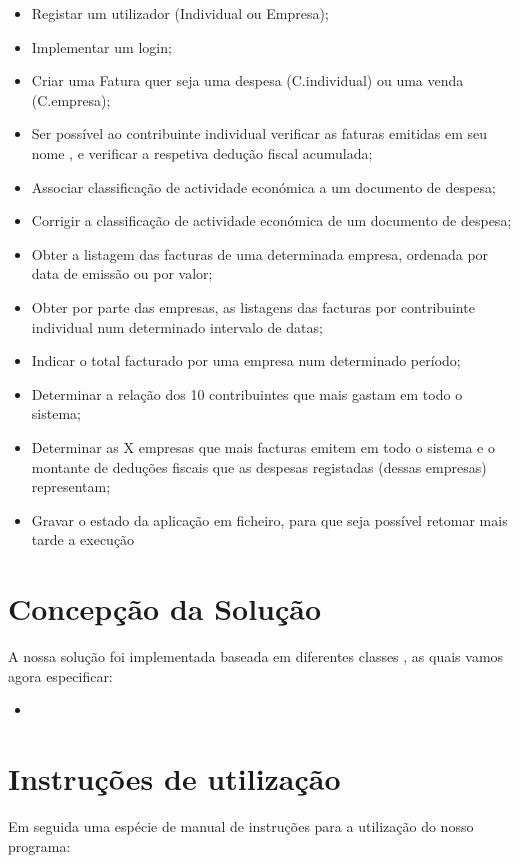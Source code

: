 \documentclass[a4paper]{article}
\begin{document}
\begin{itemize}
\item Registar um utilizador (Individual ou Empresa);
\item Implementar um login;
\item Criar uma Fatura quer seja uma despesa (C.individual) ou uma venda (C.empresa);
\item Ser possível ao contribuinte individual verificar as faturas emitidas em seu nome , e verificar a respetiva dedução fiscal acumulada;
\item Associar classificação de actividade económica a um documento de despesa;
\item Corrigir a classificação de actividade económica de um documento de despesa;
\item Obter a listagem das facturas de uma determinada empresa, ordenada por data de emissão
ou por valor;
\item Obter por parte das empresas, as listagens das facturas por contribuinte individual num determinado
intervalo de datas;
\item Indicar o total facturado por uma empresa num determinado período;
\item Determinar a relação dos 10 contribuintes que mais gastam em todo o sistema;
\item Determinar as X empresas que mais facturas emitem em todo o sistema e o montante de
deduções fiscais que as despesas registadas (dessas empresas) representam;
\item Gravar o estado da aplicação em ficheiro, para que seja possível retomar mais tarde a execução

\end{itemize}

\section{Concepção da Solução}

A nossa solução foi implementada baseada em diferentes classes , as quais vamos agora especificar:

\begin{itemize}
	\item{}

\end{itemize}

\section{Instruções de utilização}
Em seguida uma espécie de manual de instruções para a utilização do nosso programa:
\end{document}
